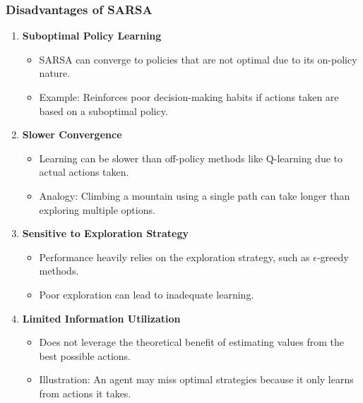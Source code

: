 \documentclass[aspectratio=169]{beamer}
\begin{document}
\begin{frame}[fragile]
    \frametitle{Disadvantages of SARSA}
    \begin{enumerate}
        \item \textbf{Suboptimal Policy Learning}
            \begin{itemize}
                \item SARSA can converge to policies that are not optimal due to its on-policy nature.
                \item Example: Reinforces poor decision-making habits if actions taken are based on a suboptimal policy.
            \end{itemize}
        \item \textbf{Slower Convergence}
            \begin{itemize}
                \item Learning can be slower than off-policy methods like Q-learning due to actual actions taken.
                \item Analogy: Climbing a mountain using a single path can take longer than exploring multiple options.
            \end{itemize}
        \item \textbf{Sensitive to Exploration Strategy}
            \begin{itemize}
                \item Performance heavily relies on the exploration strategy, such as $\epsilon$-greedy methods.
                \item Poor exploration can lead to inadequate learning.
            \end{itemize}
        \item \textbf{Limited Information Utilization}
            \begin{itemize}
                \item Does not leverage the theoretical benefit of estimating values from the best possible actions.
                \item Illustration: An agent may miss optimal strategies because it only learns from actions it takes.
            \end{itemize}
    \end{enumerate}
\end{frame}
\end{document}
